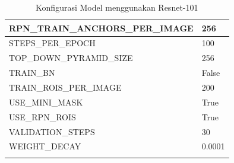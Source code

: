 \begin{longtable}[h]{|l|l|}
	RPN\_TRAIN\_ANCHORS\_PER\_IMAGE & 256                                                                                                                                                                                    \\ \hline
	STEPS\_PER\_EPOCH               & 100                                                                                                                                                                                    \\ \hline
	TOP\_DOWN\_PYRAMID\_SIZE        & 256                                                                                                                                                                                    \\ \hline
	TRAIN\_BN                       & False                                                                                                                                                                                  \\ \hline
	TRAIN\_ROIS\_PER\_IMAGE         & 200                                                                                                                                                                                    \\ \hline
	USE\_MINI\_MASK                 & True                                                                                                                                                                                   \\ \hline
	USE\_RPN\_ROIS                  & True                                                                                                                                                                                   \\ \hline
	VALIDATION\_STEPS               & 30                                                                                                                                                                                     \\ \hline
	WEIGHT\_DECAY                   & 0.0001  
	\\ \hline 
	\caption{Konfigurasi Model menggunakan Resnet-101 }
	\label{tab:conf-resnet101}
\end{longtable}

